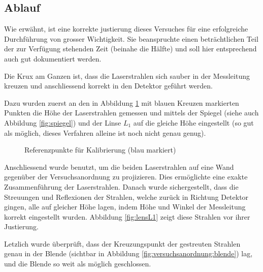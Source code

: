 \clearpage
\subsection{Ablauf}
\label{subsec:ablauf}

Wie  erw\"ahnt,  ist eine  korrekte  justierung  dieses Versuches  f\"ur  eine
erfolgreiche  Durchf\"uhrung von  grosser Wichtigkeit. Sie  beanspruchte einen
betr\"achtlichen  Teil  der  zur   Verf\"ugung  stehenden  Zeit  (beinahe  die
H\"alfte) und soll hier entsprechend auch gut dokumentiert werden.

Die Krux am Ganzen ist, dass  die Laserstrahlen sich sauber in der Messleitung
kreuzen und anschliessend korrekt in den Detektor gef\"uhrt werden.

Dazu wurden zuerst an den in Abbildung \ref{fig:justierung} mit blauen Kreuzen
markierten  Punkten die  H\"ohe  der Laserstrahlen  gemessen  und mittels  der
Spiegel (siehe auch  Abbildung \ref{fig:spiegel}) und der Linse  $L_1$ auf die
gleiche H\"ohe eingestellt (so gut als m\"oglich, dieses Verfahren alleine ist
noch nicht genau genug).

\begin{figure}[h!t]
    \centering
    \resizebox{.67\textwidth}{!}{}
    \caption{%
        Referenzpunkte f\"ur Kalibrierung (blau markiert)
    }
    \label{fig:justierung}
\end{figure}

Anschliessend wurde
benutzt,   um   die   beiden   Laserstrahlen   auf   eine   Wand   gegen\"uber
der   Versuchsanordnung  zu   projizieren. Dies   erm\"oglichte  eine   exakte
Zusammenf\"uhrung  der Laserstrahlen. Danach  wurde  sichergestellt, dass  die
Streuungen und Reflexionen der Strahlen,  welche zur\"uck in Richtung Detektor
gingen,  alle  auf  gleicher  H\"ohe   lagen,  indem  H\"ohe  und  Winkel  der
Messleitung korrekt eingestellt wurden. Abbildung \ref{fig:lensL1} zeigt diese
Strahlen vor ihrer Justierung.

Letzlich wurde \"uberpr\"uft, dass  der Kreuzungspunkt der gestreuten Strahlen
genau in der Blende (sichtbar in Abbildung \ref{fig:versuchsanordnung:blende})
lag, und die Blende so weit als m\"oglich geschlossen.

